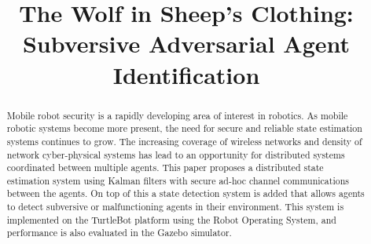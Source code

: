 \documentclass[conference]{IEEEtran}
\begin{document}
%
\title{The Wolf in Sheep's Clothing:\\
Subversive Adversarial Agent Identification}


\author{
}



\maketitle

\begin{abstract}

Mobile robot security is a rapidly developing area of interest in robotics. As mobile robotic systems become more present, the need for secure and reliable state estimation systems continues to grow. The increasing coverage of wireless networks and density of network cyber-physical systems has lead to an opportunity for distributed systems coordinated between multiple agents. This paper proposes a distributed state estimation system using Kalman filters with secure ad-hoc channel communications between the agents. On top of this a state detection system is added that allows agents to detect subversive or malfunctioning agents in their environment. This system is implemented on the TurtleBot platform using the Robot Operating System, and performance is also evaluated in the Gazebo simulator.

\end{abstract}
\end{document}
